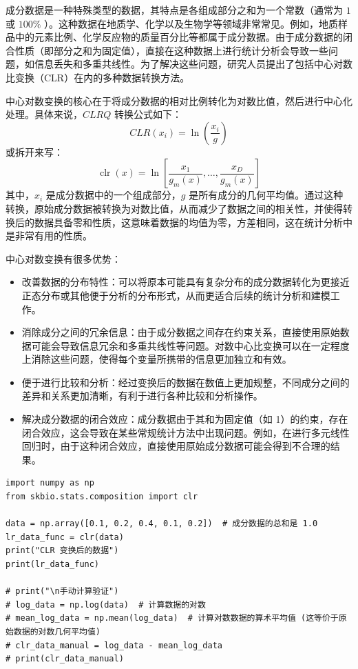 \begin{definition}[中心对数变换]
    成分数据是一种特殊类型的数据，其特点是各组成部分之和为一个常数（通常为 $1$ 或 $100 \%$ ）。这种数据在地质学、化学以及生物学等领域非常常见。例如，地质样品中的元素比例、化学反应物的质量百分比等都属于成分数据。由于成分数据的闭合性质（即部分之和为固定值），直接在这种数据上进行统计分析会导致一些问题，如信息丢失和多重共线性。为了解决这些问题，研究人员提出了包括中心对数比变换（CLR）在内的多种数据转换方法。

    中心对数变换的核心在于将成分数据的相对比例转化为对数比值，然后进行中心化处理。具体来说，$C L R Q$ 转换公式如下：
    $$
        C L R\left(x_i\right)=\ln \left(\frac{x_i}{g}\right)
    $$
    或拆开来写：
    $$\operatorname{clr}(x)=\ln \left[\frac{x_1}{g_m(x)}, \ldots, \frac{x_D}{g_m(x)}\right]$$
    其中，$x_i$ 是成分数据中的一个组成部分，$g$ 是所有成分的几何平均值。通过这种转换，原始成分数据被转换为对数比值，从而减少了数据之间的相关性，并使得转换后的数据具备零和性质，这意味着数据的均值为零，方差相同，这在统计分析中是非常有用的性质。
\end{definition}

\begin{tips}
    中心对数变换有很多优势：
    \begin{itemize}
        \item 改善数据的分布特性：可以将原本可能具有复杂分布的成分数据转化为更接近正态分布或其他便于分析的分布形式，从而更适合后续的统计分析和建模工作。
        \item 消除成分之间的冗余信息：由于成分数据之间存在约束关系，直接使用原始数据可能会导致信息冗余和多重共线性等问题。对数中心比变换可以在一定程度上消除这些问题，使得每个变量所携带的信息更加独立和有效。
        \item 便于进行比较和分析：经过变换后的数据在数值上更加规整，不同成分之间的差异和关系更加清晰，有利于进行各种比较和分析操作。
        \item 解决成分数据的闭合效应：成分数据由于其和为固定值（如 1）的约束，存在闭合效应，这会导致在某些常规统计方法中出现问题。例如，在进行多元线性回归时，由于这种闭合效应，直接使用原始成分数据可能会得到不合理的结果。
    \end{itemize}
\end{tips}

\begin{lstlisting}[style=python]
import numpy as np
from skbio.stats.composition import clr

data = np.array([0.1, 0.2, 0.4, 0.1, 0.2])  # 成分数据的总和是 1.0
lr_data_func = clr(data)
print("CLR 变换后的数据")
print(lr_data_func)

# print("\n手动计算验证")
# log_data = np.log(data)  # 计算数据的对数
# mean_log_data = np.mean(log_data)  # 计算对数数据的算术平均值 (这等价于原始数据的对数几何平均值)
# clr_data_manual = log_data - mean_log_data
# print(clr_data_manual)
\end{lstlisting}

